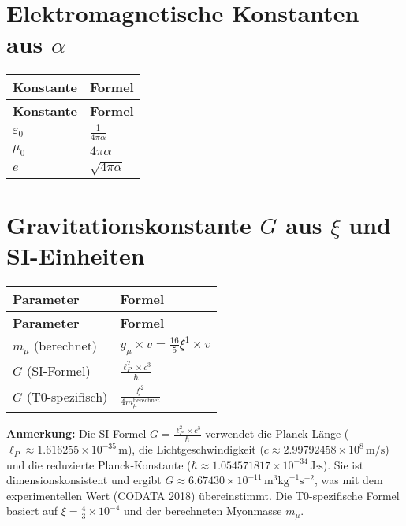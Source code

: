 \documentclass[12pt,a4paper]{article}
\begin{document}
	\section{Elektromagnetische Konstanten aus $\alpha$}
	\begin{longtable}{|p{5cm}|p{6cm}|}
		\hline
		\textbf{Konstante} & \textbf{Formel} \\
		\hline
		\endfirsthead
		\hline
		\textbf{Konstante} & \textbf{Formel} \\
		\hline
		\endhead
		$\varepsilon_0$ & $\frac{1}{4\pi\alpha}$ \\
		\hline
		$\mu_0$ & $4\pi\alpha$ \\
		\hline
		$e$ & $\sqrt{4\pi\alpha}$ \\
		\hline
	\end{longtable}
	
	\section{Gravitationskonstante $G$ aus $\xi$ und SI-Einheiten}
	\begin{longtable}{|p{5cm}|p{6cm}|}
		\hline
		\textbf{Parameter} & \textbf{Formel} \\
		\hline
		\endfirsthead
		\hline
		\textbf{Parameter} & \textbf{Formel} \\
		\hline
		\endhead
		$m_{\mu}$ (berechnet) & $y_{\mu} \times v = \frac{16}{5}\xi^{1} \times v$ \\
		\hline
		$G$ (SI-Formel) & $\frac{\ell_P^2 \times c^3}{\hbar}$ \\
		\hline
		$G$ (T0-spezifisch) & $\frac{\xi^{2}}{4m_{\mu}^{\text{berechnet}}}$ \\
		\hline
	\end{longtable}
	
	\textbf{Anmerkung:} Die SI-Formel $G = \frac{\ell_P^2 \times c^3}{\hbar}$ verwendet die Planck-Länge ($\ell_P \approx 1.616255 \times 10^{-35} \, \text{m}$), die Lichtgeschwindigkeit ($c \approx 2.99792458 \times 10^8 \, \text{m/s}$) und die reduzierte Planck-Konstante ($\hbar \approx 1.054571817 \times 10^{-34} \, \text{J·s}$). Sie ist dimensionskonsistent und ergibt $G \approx 6.67430 \times 10^{-11} \, \text{m}^3 \text{kg}^{-1} \text{s}^{-2}$, was mit dem experimentellen Wert (CODATA 2018) übereinstimmt. Die T0-spezifische Formel basiert auf $\xi = \frac{4}{3} \times 10^{-4}$ und der berechneten Myonmasse $m_\mu$.
	
\end{document}
